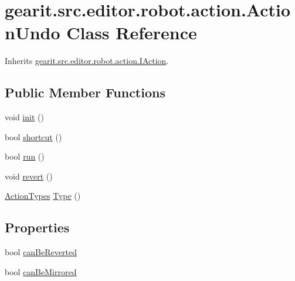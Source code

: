 \hypertarget{classgearit_1_1src_1_1editor_1_1robot_1_1action_1_1_action_undo}{\section{gearit.\+src.\+editor.\+robot.\+action.\+Action\+Undo Class Reference}
\label{classgearit_1_1src_1_1editor_1_1robot_1_1action_1_1_action_undo}
}


Inherits \hyperlink{interfacegearit_1_1src_1_1editor_1_1robot_1_1action_1_1_i_action}{gearit.\+src.\+editor.\+robot.\+action.\+I\+Action}.

\subsection*{Public Member Functions}
\begin{DoxyCompactItemize}
\item 
void \hyperlink{classgearit_1_1src_1_1editor_1_1robot_1_1action_1_1_action_undo_a10c0b0db6fce254ef32a9b3b03bc2e12}{init} ()
\item 
bool \hyperlink{classgearit_1_1src_1_1editor_1_1robot_1_1action_1_1_action_undo_a8996575f3339e88177e7bdc7fc56207e}{shortcut} ()
\item 
bool \hyperlink{classgearit_1_1src_1_1editor_1_1robot_1_1action_1_1_action_undo_aaeb5b3f8fcecef955c90d6150784e3bf}{run} ()
\item 
void \hyperlink{classgearit_1_1src_1_1editor_1_1robot_1_1action_1_1_action_undo_a803b2dbdb2c44f59254cf224b75082dd}{revert} ()
\item 
\hyperlink{namespacegearit_1_1src_1_1editor_1_1robot_1_1action_a4be0fd46e3952d6135136b20e7b3fc5e}{Action\+Types} \hyperlink{classgearit_1_1src_1_1editor_1_1robot_1_1action_1_1_action_undo_a2c0b6d28b238edbfe15a389e54f81521}{Type} ()
\end{DoxyCompactItemize}
\subsection*{Properties}
\begin{DoxyCompactItemize}
\item 
bool \hyperlink{classgearit_1_1src_1_1editor_1_1robot_1_1action_1_1_action_undo_ae218328216db4bd4db4eff6c4695b312}{can\+Be\+Reverted}
\item 
bool \hyperlink{classgearit_1_1src_1_1editor_1_1robot_1_1action_1_1_action_undo_a1212463debcb9973f4356a10829bf38b}{can\+Be\+Mirrored}
\end{DoxyCompactItemize}


